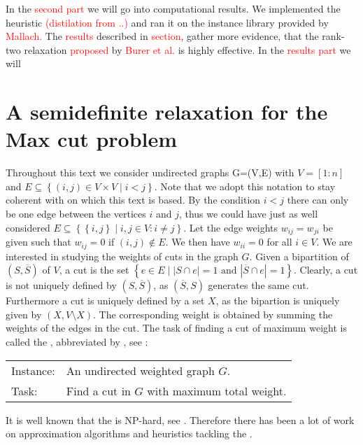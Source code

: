 \documentclass[12pt,a4paper]{article}
\theoremstyle{mythm}
\begin{document}
In the \textcolor{red}{second part} we will go into computational results.
We implemented the heuristic \textcolor{red}{(distilation from ..)} and ran it on the instance library provided by \textcolor{red}{Mallach.}
The \textcolor{red}{results} described in \textcolor{red}{section}, gather more evidence, that the rank-two relaxation \textcolor{red}{proposed } by \textcolor{red}{Burer et
al.} is highly effective.
In the \textcolor{red}{results part} we will 
\newpage

\section{ A semidefinite relaxation for the Max cut problem  } 
\label{Goemans-Williamson} 
Throughout this text we consider undirected graphs G=(V,E) with $ V = \left[ 1:n \right] $ and $ E \subseteq \left\{ \left( i,j \right)  \in V \times V \mid i<j \right\} $.
Note that we adopt this notation to stay coherent with \cite{Burer2002} on which this text is based.
By the condition $ i < j $ there can only be one edge between the vertices $ i $ and $ j $, thus we could have just as well considered $ E \subseteq \left\{ \left\{ i,j
\right\}  \mid i,j \in V: i \neq j  \right\} $.
Let the edge weights $ w _{ ij } = w _{ ji }  $ be given such that $ w _{ ij } = 0 $ if $ \left( i,j \right) \notin E $. We then have $ w _{ ii } = 0 $ for all $ i \in V $.
We are interested in studying the weights of cuts in the graph $ G $.
Given a bipartition of $ \left( S , \overline{ S }  \right)  $ of $ V $, a cut is the set $ \left\{ e \in E \mid \left| S \cap e \right| = 1 \text{ and } \left| \overline{ S }
\cap e \right| = 1  \right\}  $. Clearly, a cut is not uniquely defined by $ \left( S , \overline{ S }  \right)  $, as $ \left( \overline{ S } , S \right)  $ generates the
same cut. 
Furthermore a cut is uniquely defined by a set $ X $, as the bipartion is uniquely given by $ \left( X, V \setminus X \right)  $.
The corresponding weight is obtained by summing the weights of the edges in the cut.
The task of finding a cut of maximum weight is called the \mcp , abbreviated by \MCP, see \cite{Korte2018}:
\begin{mdframed}[frametitle= {Maximum Weight Cut Problem}]
\begin{tabular}{ll}
Instance: &An undirected weighted graph $ G $. \\
Task: &Find a cut in $ G $ with maximum total weight.
\end{tabular}
\end{mdframed}
It is well known that the \MCP is NP-hard, see \cite{Garey1974}. Therefore there has been a lot of work on approximation algorithms and heuristics tackling the \MCP.
\end{document}
